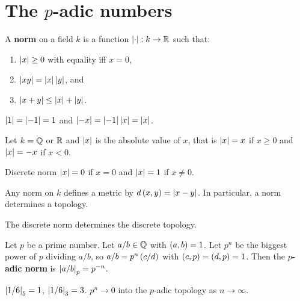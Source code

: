 \section{The $ p $-adic numbers}

\begin{definition}
A \textbf{norm} on a field $ k $ is a function $ \left\lvert \cdot \right\rvert : k \to \mathbb{R} $ such that:
\begin{enumerate}
\item $ \left\lvert x \right\rvert \ge 0 $ with equality iff $ x = 0 $,
\item $ \left\lvert xy \right\rvert = \left\lvert x \right\rvert\left\lvert y \right\rvert $, and
\item $ \left\lvert x + y \right\rvert \le \left\lvert x \right\rvert + \left\lvert y \right\rvert $.
\end{enumerate}
\end{definition}

\begin{note*}
$ \left\lvert 1 \right\rvert = \left\lvert -1 \right\rvert = 1 $ and $ \left\lvert -x \right\rvert = \left\lvert -1 \right\rvert\left\lvert x \right\rvert = \left\lvert x \right\rvert $.
\end{note*}

\begin{example*}
Let $ k = \mathbb{Q} $ or $ \mathbb{R} $ and $ \left\lvert x \right\rvert $ is the absolute value of $ x $, that is $ \left\lvert x \right\rvert = x $ if $ x \ge 0 $ and $ \left\lvert x \right\rvert = -x $ if $ x < 0 $.
\end{example*}

\begin{example*}
Discrete norm $ \left\lvert x \right\rvert = 0 $ if $ x = 0 $ and $ \left\lvert x \right\rvert = 1 $ if $ x \ne 0 $.
\end{example*}

\begin{remark}
Any norm on $ k $ defines a metric by $ d\left( x, y \right) = \left\lvert x - y \right\rvert $. In particular, a norm determines a topology.
\end{remark}

\begin{example*}
The discrete norm determines the discrete topology.
\end{example*}

\begin{definition}
Let $ p $ be a prime number. Let $ a / b \in \mathbb{Q} $ with $ \left( a, b \right) = 1 $. Let $ p^n $ be the biggest power of $ p $ dividing $ a / b $, so $ a / b = p^n \left( c / d \right) $ with $ \left( c, p \right) = \left( d, p \right) = 1 $. Then the \textbf{$ p $-adic norm} is $ \left\lvert a / b \right\rvert_p = p^{-n} $.
\end{definition}

\begin{example*}
$ \left\lvert 1 / 6 \right\rvert_5 = 1 $, $ \left\lvert 1 / 6 \right\rvert_3 = 3 $. $ p^n \to 0 $ into the $ p $-adic topology as $ n \to \infty $.
\end{example*}

